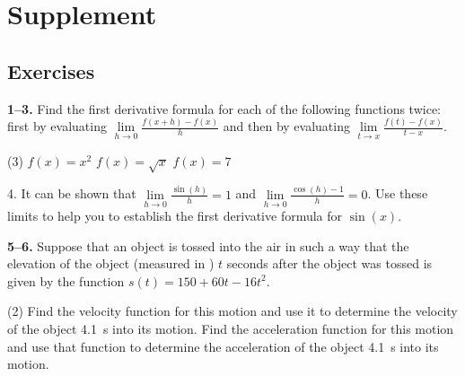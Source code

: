 \documentclass[10pt,oneside,]{book}
\theoremstyle{plain}
\theoremstyle{definition}
\numberwithin{equation}{section}
\newcommand{\fe}[2]{#1\mathopen{}\left(#2\right)\mathclose{}}
\begin{document}
\section[Supplement]{Supplement}\label{introduction-first-derivative-supplementary-exercises}
\typeout{************************************************}
\typeout{************************************************}
\subsection[Exercises]{Exercises}\label{exercises-23}
\textbf{1--3. }\hypertarget{exercisegroup-40}{\null}Find the first derivative formula for each of the following functions twice: first by evaluating \(\lim\limits_{h\to0}\frac{\fe{f}{x+h}-\fe{f}{x}}{h}\) and then by evaluating \(\lim\limits_{t\to x}\frac{\fe{f}{t}-\fe{f}{x}}{t-x}\).%
\par
\begin{exercisegroup}(3)
\exercise[1.]\hypertarget{exercise-201}{\null}\(\fe{f}{x}=x^2\)%
\exercise[2.]\hypertarget{exercise-202}{\null}\(\fe{f}{x}=\sqrt{x}\)%
\exercise[3.]\hypertarget{exercise-203}{\null}\(\fe{f}{x}=7\)%
\end{exercisegroup}
\par\smallskip\noindent
\begin{exerciselist}
\item[4.]\hypertarget{exercise-204}{\null}It can be shown that \(\lim\limits_{h\to0}\frac{\fe{\sin}{h}}{h}=1\) and \(\lim\limits_{h\to0}\frac{\fe{\cos}{h}-1}{h}=0\).  Use these limits to help you to establish the first derivative formula for \(\fe{\sin}{x}\).%
\par\smallskip
\end{exerciselist}
\textbf{5--6. }\hypertarget{exercisegroup-41}{\null}Suppose that an object is tossed into the air in such a way that the elevation of the object (measured in \si{\foot}) \(t\) seconds after the object was tossed is given by the function \(\fe{s}{t}=150+60t-16t^2\).%
\par
\begin{exercisegroup}(2)
\exercise[5.]\hypertarget{exercise-205}{\null}Find the velocity function for this motion and use it to determine the velocity of the object \SI{4.1}{\second} into its motion.%
\exercise[6.]\hypertarget{exercise-206}{\null}Find the acceleration function for this motion and use that function to determine the acceleration of the object \SI{4.1}{\second} into its motion.%
\end{exercisegroup}
\end{document}
